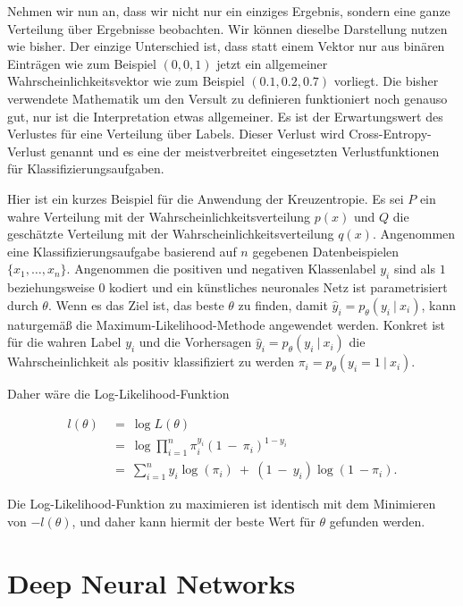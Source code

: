 Nehmen wir nun an, dass wir nicht nur ein einziges Ergebnis, sondern eine ganze Verteilung über Ergebnisse beobachten. Wir können dieselbe Darstellung nutzen wie bisher. Der einzige Unterschied ist, dass statt einem Vektor nur aus binären Einträgen wie zum Beispiel $(0, 0, 1)$ jetzt ein allgemeiner Wahrscheinlichkeitsvektor wie zum Beispiel $(0.1, 0.2, 0.7)$ vorliegt. Die bisher verwendete Mathematik um den Versult zu definieren funktioniert noch genauso gut, nur ist die Interpretation etwas allgemeiner. Es ist der Erwartungswert des Verlustes für eine Verteilung über Labels. Dieser Verlust wird Cross-Entropy-Verlust genannt und es eine der meistverbreitet eingesetzten Verlustfunktionen für Klassifizierungsaufgaben.

Hier ist ein kurzes Beispiel für die Anwendung der Kreuzentropie. Es sei $P$ ein wahre Verteilung mit der Wahrscheinlichkeitsverteilung $p(x)$ und $Q$ die geschätzte Verteilung mit der Wahrscheinlichkeitsverteilung $q(x)$. Angenommen eine Klassifizierungsaufgabe basierend auf $n$ gegebenen Datenbeispielen $\{x_{1}, \dots, x_{n}\}$. Angenommen die positiven und negativen Klassenlabel $y_{i}$ sind als $1$ beziehungsweise $0$ kodiert und ein künstliches neuronales Netz ist parametrisiert durch $\theta$. Wenn es das Ziel ist, das beste $\theta$ zu finden, damit $\hat{y}_{i} = p_{\theta}(y_{i}\ |\ x_{i})$, kann naturgemäß die Maximum-Likelihood-Methode angewendet werden. Konkret ist für die wahren Label $y_{i}$ und die Vorhersagen $\hat{y}_{i} = p_{\theta}(y_{i}\ |\ x_{i})$ die Wahrscheinlichkeit als positiv klassifiziert zu werden $\pi_{i} = p_{\theta}(y_{i} = 1\ |\ x_{i})$.

Daher wäre die Log-Likelihood-Funktion

\begin{align}
  l(\theta)\ &=\ \log L(\theta) \\
  &=\ \log\prod_{i=1}^{n}\pi_{i}^{y_{i}} (1\ -\ \pi_{i})^{1-y_{i}} \tag*{}\\
  &=\ \sum_{i=1}^{n}y_{i}\log(\pi_{i})\ +\ (1\ -\ y_{i})\log(1\ - \pi_{i}). \tag*{}
\end{align}

Die Log-Likelihood-Funktion zu maximieren ist identisch mit dem Minimieren von $-l(\theta)$, und daher kann hiermit der beste Wert für $\theta$ gefunden werden.
\cite{zhang2020dive}

\section{Deep Neural Networks}
\label{sec:dnn}

